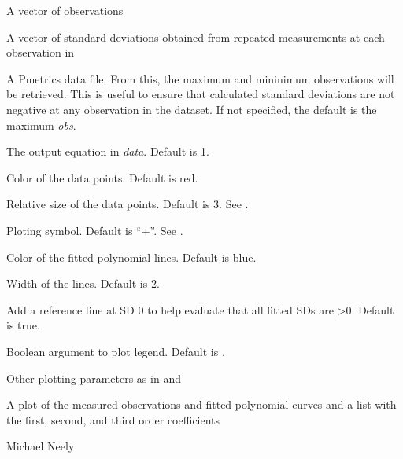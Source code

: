 \documentclass[a4paper]{book}
\begin{document}
\begin{Arguments}
\begin{ldescription}
\item[\code{obs}] A vector of observations

\item[\code{sd}] A vector of standard deviations obtained from repeated measurements at each
observation in 

\item[\code{data}] A Pmetrics data file.  From this, the maximum and mininimum observations will be retrieved.
This is useful to ensure that calculated standard deviations are not negative
at any observation in the dataset.  If not specified, the default is the maximum \emph{obs}.

\item[\code{outeq}] The output equation in \emph{data}.  Default is 1.

\item[\code{col}] Color of the data points. Default is red.

\item[\code{cex}] Relative size of the data points.  Default is 3. See .

\item[\code{pch}] Ploting symbol.  Default is ``+''.  See .

\item[\code{lcol}] Color of the fitted polynomial lines.  Default is blue.

\item[\code{lwd}] Width of the lines. Default is 2.

\item[\code{ref}] Add a reference line at SD 0 to help evaluate that all fitted SDs are >0.  Default is true.

\item[\code{legend}] Boolean argument to plot legend.  Default is .

\item[\code{...}] Other plotting parameters as in  and 
\end{ldescription}
\end{Arguments}
%
\begin{Value}
A plot of the measured observations and fitted polynomial curves and a list with the
first, second, and third order coefficients
\end{Value}
%
\begin{Author}\relax
Michael Neely
\end{Author}
\end{document}

